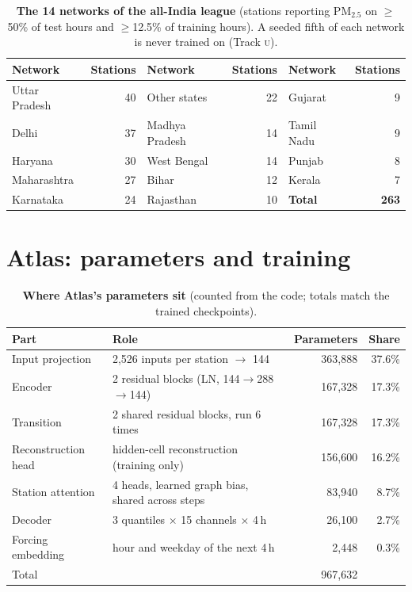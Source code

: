 \documentclass{article}
\newcommand{\pmtf}{PM$_{2.5}$}
\newcommand{\trk}[1]{\textsc{#1}}
\begin{document}
\begin{table}[h]
\caption{\textbf{The 14 networks of the all-India league} (stations reporting \pmtf{} on $\ge$50\% of test hours and
$\ge$12.5\% of training hours). A seeded fifth of each network is never trained on (Track \trk{u}).}
\label{tab:nets}
\centering\small
\begin{tabular}{lr@{\hspace{18pt}}lr@{\hspace{18pt}}lr}
\toprule
Network & Stations & Network & Stations & Network & Stations \\
\midrule
Uttar Pradesh & 40 & Other states & 22 & Gujarat & 9 \\
Delhi & 37 & Madhya Pradesh & 14 & Tamil Nadu & 9 \\
Haryana & 30 & West Bengal & 14 & Punjab & 8 \\
Maharashtra & 27 & Bihar & 12 & Kerala & 7 \\
Karnataka & 24 & Rajasthan & 10 & \textbf{Total} & \textbf{263} \\
\bottomrule
\end{tabular}
\end{table}

\section{Atlas: parameters and training}
\label{app:atlas}

\begin{table}[h]
\caption{\textbf{Where Atlas's parameters sit} (counted from the code; totals match the trained checkpoints).}
\label{tab:params}
\centering\small
\begin{tabular}{llrr}
\toprule
Part & Role & Parameters & Share \\
\midrule
Input projection & 2{,}526 inputs per station $\to$ 144 & 363{,}888 & 37.6\% \\
Encoder & 2 residual blocks (LN, 144$\to$288$\to$144) & 167{,}328 & 17.3\% \\
Transition & 2 shared residual blocks, run 6 times & 167{,}328 & 17.3\% \\
Reconstruction head & hidden-cell reconstruction (training only) & 156{,}600 & 16.2\% \\
Station attention & 4 heads, learned graph bias, shared across steps & 83{,}940 & 8.7\% \\
Decoder & 3 quantiles $\times$ 15 channels $\times$ 4\,h & 26{,}100 & 2.7\% \\
Forcing embedding & hour and weekday of the next 4\,h & 2{,}448 & 0.3\% \\
\midrule
Total & & 967{,}632 & \\
\bottomrule
\end{tabular}
\end{table}
\end{document}
